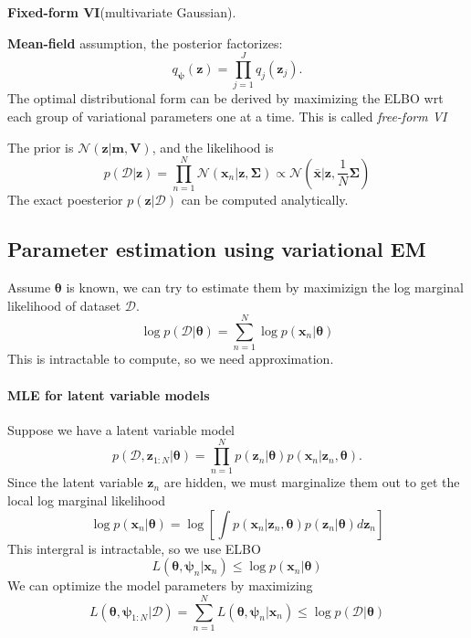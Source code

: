 \documentclass[../main.tex]{subfiles}
\begin{document}
\textbf{Fixed-form VI}(multivariate Gaussian). 

\textbf{Mean-field} assumption, the posterior factorizes:
\[
q_{\boldsymbol{\psi}}(\boldsymbol{z}) = \prod_{j=1}^{J} q_{j}(\boldsymbol{z}_{j}).
\]
The optimal distributional form can be derived by maximizing the ELBO wrt each group of variational parameters one at a time. This is called \emph{free-form VI}

\begin{note}
   The prior is $\mathcal{N}(\boldsymbol{z} | \boldsymbol{m}, \boldsymbol{V})$, and the likelihood is 
   \[
   p(\mathcal{D} | \boldsymbol{z}) = \prod_{n=1}^{N} \mathcal{N}(\boldsymbol{x}_{n} | \boldsymbol{z}, \boldsymbol{\Sigma}) \propto \mathcal{N}(\bar{\boldsymbol{x}} | \boldsymbol{z}, \frac{1}{N}\boldsymbol{\Sigma})
   \]
   The exact poesterior $p(\boldsymbol{z} | \mathcal{D})$ can be computed analytically.
\end{note} 


\subsection{Parameter estimation using variational EM}

Assume $\boldsymbol{\theta}$ is known, we can try to estimate them by maximizign the log marginal likelihood of dataset $\mathcal{D}$.
\[
\log p(\mathcal{D} | \boldsymbol{\theta}) = \sum_{n=1}^{N} \log p(\boldsymbol{x}_{n} | \boldsymbol{\theta})
\]
This is intractable to compute, so we need approximation.

\paragraph{MLE for latent variable models}

Suppose we have a latent variable  model
\[
p(\mathcal{D}, \boldsymbol{z}_{1 : N} | \boldsymbol{\theta})  = \prod_{n=1}^{N} p(\boldsymbol{z}_{n} | \boldsymbol{\theta}) p(\boldsymbol{x}_{n} | \boldsymbol{z}_{n}, \boldsymbol{\theta}).
\]
Since the latent variable $\boldsymbol{z}_{n}$ are hidden, we must marginalize them out 
to get the local log marginal likelihood
\[
\log p(\boldsymbol{x}_{n} | \boldsymbol{\theta})  =  \log \left[ \int  p\left( \boldsymbol{x}_{n} | \boldsymbol{z}_{n}, \boldsymbol{\theta} \right) p(\boldsymbol{z}_{n} | \boldsymbol{\theta}) d \boldsymbol{z}_{n}\right] 
\]
This intergral is intractable, so we use ELBO
\[
L(\boldsymbol{\theta}, \boldsymbol{\psi}_{n} | \boldsymbol{x}_{n})  \le  \log p(\boldsymbol{x}_{n} | \boldsymbol{\theta})
\]
We can optimize the model parameters by maximizing
\[
L(\boldsymbol{\theta}, \boldsymbol{\psi}_{1 : N} | \mathcal{D}) = \sum_{n=1}^{N}L(\boldsymbol{\theta}, \boldsymbol{\psi}_{n} | \boldsymbol{x}_{n}) \le  \log p (\mathcal{D} | \boldsymbol{\theta})
\]
\end{document}
